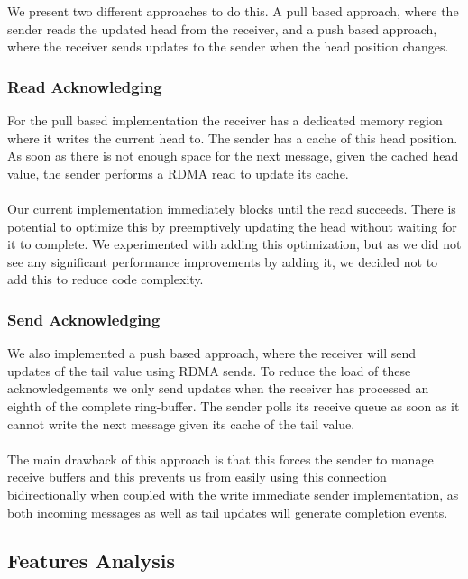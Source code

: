 We present two different approaches to do this. A pull based approach, where the sender reads the updated head from the
receiver, and a push based approach, where the receiver sends updates to the sender when the head position changes.

\subsubsection{Read Acknowledging}
For the pull based implementation the receiver has a dedicated memory region where it writes the current 
head to. The sender has a cache of this head position. As soon as there is not enough space for the next message, given 
the cached head value, the sender performs a RDMA read to update its cache.

\paragraph{} Our current implementation immediately blocks until the read succeeds. There is potential to optimize this by preemptively 
updating the head without waiting for it to complete. We experimented with adding this optimization, but as we did not see any significant 
performance improvements by adding it, we decided not to add this to reduce code complexity. 

\subsubsection{Send Acknowledging} 

We also implemented a push based approach, where the receiver will send updates of the tail value using 
RDMA sends. To reduce the load of these acknowledgements we only send updates when the receiver has processed an eighth of 
the complete ring-buffer. The sender polls its receive queue as soon as it cannot write the next message given its
cache of the tail value.

\paragraph{} The main drawback of this approach is that this forces the sender to manage receive buffers and this prevents
us from easily using this connection bidirectionally when coupled with the write immediate sender implementation, as both 
incoming messages as well as tail updates will generate completion events.

\subsection{Features Analysis}

